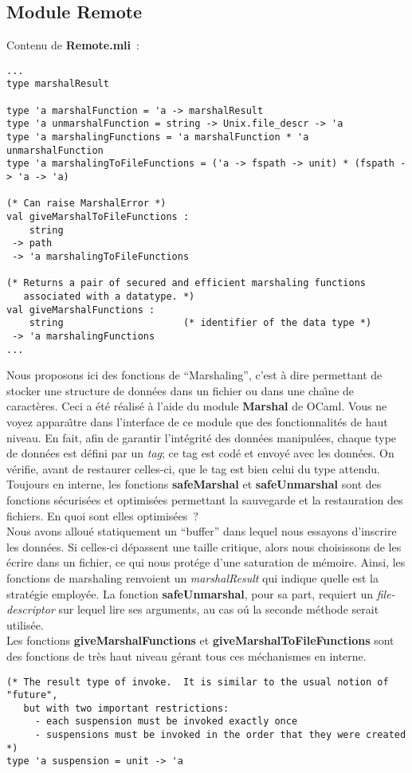 \documentclass[11pt]{report}
\newcommand{\data}[1]{\emph{#1}}
\newcommand{\func}[1]{\textbf{#1}}
\newcommand{\modu}[1]{\textbf{#1}}
\begin{document}
{\subsection{Module Remote}
Contenu de \modu{Remote.mli}~:
\begin{verbatim}
...
type marshalResult

type 'a marshalFunction = 'a -> marshalResult
type 'a unmarshalFunction = string -> Unix.file_descr -> 'a
type 'a marshalingFunctions = 'a marshalFunction * 'a unmarshalFunction
type 'a marshalingToFileFunctions = ('a -> fspath -> unit) * (fspath -> 'a -> 'a)

(* Can raise MarshalError *)
val giveMarshalToFileFunctions :
    string
 -> path
 -> 'a marshalingToFileFunctions

(* Returns a pair of secured and efficient marshaling functions
   associated with a datatype. *)
val giveMarshalFunctions : 
    string                     (* identifier of the data type *)
 -> 'a marshalingFunctions
...
\end{verbatim}
Nous proposons ici des fonctions de ``Marshaling'', c'est \`a dire 
permettant de stocker une structure de donn\'ees dans un fichier ou dans une 
cha\^{\i}ne de caract\`eres. Ceci a \'et\'e r\'ealis\'e \`a l'aide du module
\modu{Marshal} de OCaml. Vous ne voyez appara\^{\i}tre dans l'interface de ce
module que des fonctionnalit\'es de haut niveau. En fait, afin de garantir
l'int\'egrit\'e des donn\'ees manipul\'ees, chaque type de donn\'ees est d\'efini par un
\data{tag}; ce tag est cod\'e et envoy\'e avec les donn\'ees. On v\'erifie, 
avant de restaurer celles-ci, que le tag est bien celui du type attendu.\\
Toujours en interne, les fonctions \func{safeMarshal} et 
\func{safeUnmarshal} sont des
fonctions s\'ecuris\'ees et optimis\'ees permettant la sauvegarde et la 
restauration des fichiers. En quoi sont elles optimis\'ees~?\\
Nous avons allou\'e statiquement un ``buffer'' dans lequel nous essayons
d'inscrire les donn\'ees. Si celles-ci d\'epassent une taille critique,
alors nous choisissons de les \'ecrire dans un fichier, ce qui nous prot\'ege
d'une saturation de m\'emoire.
Ainsi, les fonctions de marshaling renvoient un \data{marshalResult}
qui indique quelle est la strat\'egie employ\'ee. La fonction 
\func{safeUnmarshal}, pour sa part, requiert un \data{file-descriptor} sur lequel
lire ses arguments, au cas o\'u la seconde m\'ethode serait utilis\'ee.\\
Les fonctions \func{giveMarshalFunctions} et \func{giveMarshalToFileFunctions}
 sont des fonctions de tr\`es haut niveau g\'erant tous ces m\'echanismes en 
interne.
\begin{verbatim}
(* The result type of invoke.  It is similar to the usual notion of "future",
   but with two important restrictions:
     - each suspension must be invoked exactly once
     - suspensions must be invoked in the order that they were created *)
type 'a suspension = unit -> 'a


\end{verbatim}}
\end{document}
